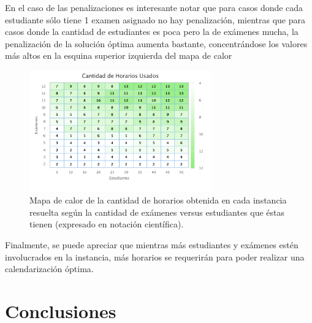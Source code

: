 \documentclass[letter, 10pt]{article}
\begin{document}
En el caso de las penalizaciones es interesante notar que para casos donde cada estudiante sólo tiene 1 examen asignado no hay penalización, mientras que para casos donde la cantidad de estudiantes es poca pero la de exámenes mucha, la penalización de la solución óptima aumenta bastante, concentrándose los valores más altos en la esquina superior izquierda del mapa de calor

\begin{figure}[H]
\begin{center}
\includegraphics[width=0.7\textwidth]{img/g7.pdf}
\end{center}
\caption{Mapa de calor de la cantidad de horarios obtenida en cada instancia resuelta según la cantidad de exámenes versus estudiantes que éstas tienen (expresado en notación científica).}
\label{fig:g6}
\end{figure}

Finalmente, se puede apreciar que mientras más estudiantes y exámenes estén involucrados en la instancia, más horarios se requerirán para poder realizar una calendarización óptima.

\section{Conclusiones} \label{conclusiones}
\end{document}
